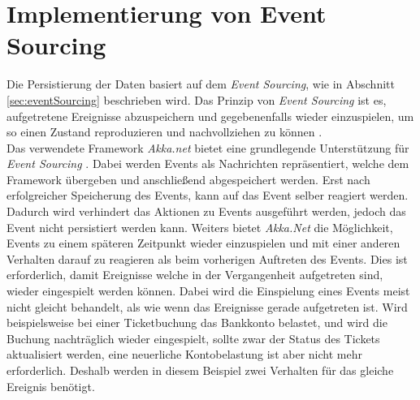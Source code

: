 \section{Implementierung von Event Sourcing}
\label{sec:implementation:eventSouring}
Die Persistierung der Daten basiert auf dem \textit{Event Sourcing}, wie in Abschnitt \ref{sec:eventSourcing} beschrieben wird. Das Prinzip von \textit{Event Sourcing} ist es, aufgetretene Ereignisse abzuspeichern und gegebenenfalls wieder einzuspielen, um so einen Zustand reproduzieren und nachvollziehen zu können \citep{betts2013CQRSEventSourcing}. \\
Das verwendete Framework \textit{Akka.net} bietet eine grundlegende Unterstützung für \textit{Event Sourcing} \citep{Akka.netCommunityAkka.NETDocumentation}. Dabei werden Events als Nachrichten repräsentiert, welche dem Framework übergeben und anschließend abgespeichert werden. 
Erst nach erfolgreicher Speicherung des Events, kann auf das Event selber reagiert werden. Dadurch wird verhindert das Aktionen zu Events ausgeführt werden, jedoch das Event nicht persistiert werden kann. Weiters bietet \textit{Akka.Net} die Möglichkeit, Events zu einem späteren Zeitpunkt wieder einzuspielen und mit einer anderen Verhalten darauf zu reagieren als beim vorherigen Auftreten des Events. Dies ist erforderlich, damit Ereignisse welche in der Vergangenheit aufgetreten sind, wieder eingespielt werden können. Dabei wird die Einspielung eines Events meist nicht gleicht behandelt, als wie wenn das Ereignisse gerade aufgetreten ist. Wird beispielsweise bei einer Ticketbuchung das Bankkonto belastet, und wird die Buchung nachträglich wieder eingespielt, sollte zwar der Status des Tickets aktualisiert werden, eine neuerliche Kontobelastung ist aber nicht mehr erforderlich. Deshalb werden in diesem Beispiel zwei Verhalten für das gleiche Ereignis benötigt.
